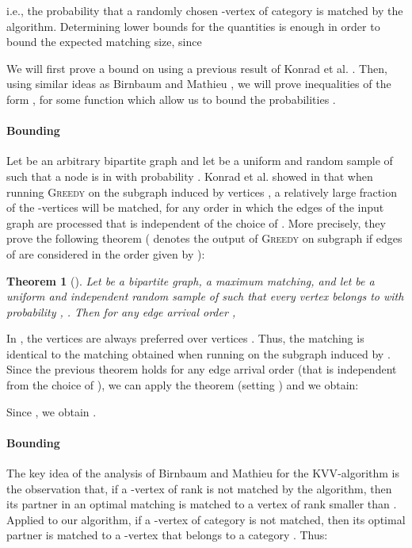 \documentclass[a4paper]{article}
\newtheorem{theorem}{Theorem}
\begin{document}
i.e., the probability that a randomly chosen -vertex of category  is matched by the algorithm. Determining
lower bounds for the quantities  is enough in order to bound the expected matching size, since

We will first prove a bound on  using a previous result of Konrad et al. \cite{kmm12}.
Then, using similar ideas as Birnbaum and Mathieu \cite{bm08}, we will prove inequalities of the form
, for some function  which allow us to bound the probabilities
.

\paragraph*{Bounding }
Let  be an arbitrary bipartite graph and let  be a uniform and random sample of 
such that a node  is in  with probability . Konrad et al. showed in \cite{kmm12} that when
running \textsc{Greedy} on the subgraph induced by vertices , a relatively large fraction
of the -vertices will be matched, for any order in which the edges of the input graph
are processed that is independent of the choice of . More precisely, they prove the following theorem
( denotes the output of \textsc{Greedy} on subgraph  if
edges of  are considered in the order given by ):
\begin{theorem}[\cite{kmm12}]
 Let  be a bipartite graph,  a maximum matching, and let  be a uniform and independent random sample
 of  such that every vertex belongs to  with probability , . Then for any edge arrival
 order , 
\end{theorem}
In , the vertices  are always preferred over vertices . Thus,
the matching  is identical to the matching obtained
when running  on the subgraph induced by . Since the previous theorem
holds for any edge arrival order (that is independent from the choice of ), we can apply
the theorem (setting ) and we obtain:

Since , we obtain .

\paragraph*{Bounding } The key idea of the analysis of Birnbaum and Mathieu for
the \textsc{KVV}-algorithm is the observation that, if a -vertex of rank  is not matched by the
algorithm, then its partner in an optimal matching is matched to a vertex of rank smaller than .
Applied to our algorithm, if a -vertex of category  is not matched, then its optimal
partner  is matched to a -vertex that belongs to a category . Thus:
\end{document}
